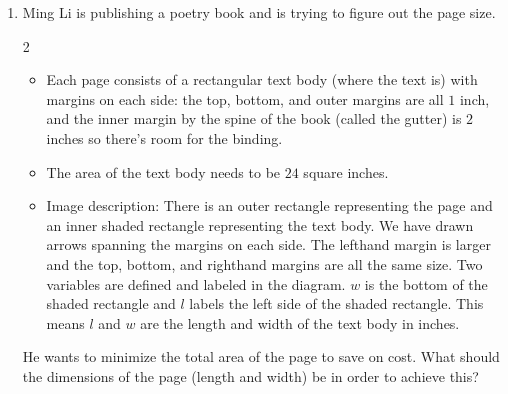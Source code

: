 \documentclass{article}
\begin{document}
\begin{enumerate}
\begin{enumerate}
    \end{enumerate}
\newpage
\item 

\begin{problem}
    
Ming Li is publishing a poetry book and is trying to figure out the page size. 
\begin{multicols}{2}
     \begin{itemize}
         \item Each page consists of a rectangular text body (where the text is) with margins on each side: the top, bottom, and outer margins are all $1$ inch, and the inner margin by the spine of the book (called the gutter) is $2$ inches so there's room for the binding. \\

          
         \item The area of the text body needs to be $24$ square inches.
         
         \item Image description: There is an outer rectangle representing the page and an inner shaded rectangle representing the text body. We have drawn arrows spanning the margins on each side. The lefthand margin is larger and the top, bottom, and righthand margins are all the same size. Two variables are defined and labeled in the diagram. $w$ is the bottom of the shaded rectangle and $l$ labels the left side of the shaded rectangle. This means $l$ and $w$ are the length and width of the text body in inches. \\

\end{itemize}
\end{multicols}
          He wants to minimize the total area of the page to save on  cost. 
          What should the dimensions of the page (length and width) be in order to achieve this? \\


\end{problem}
\end{enumerate}
\end{document}
